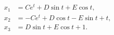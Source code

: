 \[\begin{aligned}x_1&=Ce^t+D\sin t+E\cos t,\\x_2&=-Ce^t+D\cos t-E\sin t+t,\\x_3&=D\sin t+E\cos t+1.\end{aligned}\]
